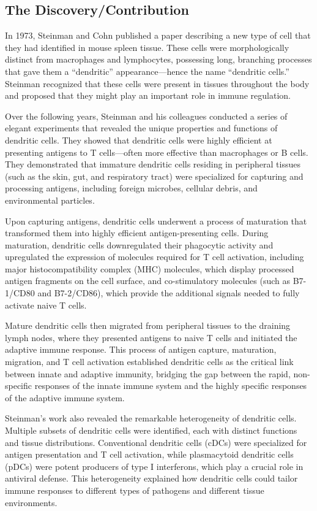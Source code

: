 \subsection{The Discovery/Contribution}

In 1973, Steinman and Cohn published a paper describing a new type of cell that they had identified in mouse spleen tissue. These cells were morphologically distinct from macrophages and lymphocytes, possessing long, branching processes that gave them a ``dendritic'' appearance---hence the name ``dendritic cells.'' Steinman recognized that these cells were present in tissues throughout the body and proposed that they might play an important role in immune regulation.

Over the following years, Steinman and his colleagues conducted a series of elegant experiments that revealed the unique properties and functions of dendritic cells. They showed that dendritic cells were highly efficient at presenting antigens to T cells---often more effective than macrophages or B cells. They demonstrated that immature dendritic cells residing in peripheral tissues (such as the skin, gut, and respiratory tract) were specialized for capturing and processing antigens, including foreign microbes, cellular debris, and environmental particles.

Upon capturing antigens, dendritic cells underwent a process of maturation that transformed them into highly efficient antigen-presenting cells. During maturation, dendritic cells downregulated their phagocytic activity and upregulated the expression of molecules required for T cell activation, including major histocompatibility complex (MHC) molecules, which display processed antigen fragments on the cell surface, and co-stimulatory molecules (such as B7-1/CD80 and B7-2/CD86), which provide the additional signals needed to fully activate naive T cells.

Mature dendritic cells then migrated from peripheral tissues to the draining lymph nodes, where they presented antigens to naive T cells and initiated the adaptive immune response. This process of antigen capture, maturation, migration, and T cell activation established dendritic cells as the critical link between innate and adaptive immunity, bridging the gap between the rapid, non-specific responses of the innate immune system and the highly specific responses of the adaptive immune system.

Steinman's work also revealed the remarkable heterogeneity of dendritic cells. Multiple subsets of dendritic cells were identified, each with distinct functions and tissue distributions. Conventional dendritic cells (cDCs) were specialized for antigen presentation and T cell activation, while plasmacytoid dendritic cells (pDCs) were potent producers of type I interferons, which play a crucial role in antiviral defense. This heterogeneity explained how dendritic cells could tailor immune responses to different types of pathogens and different tissue environments.

